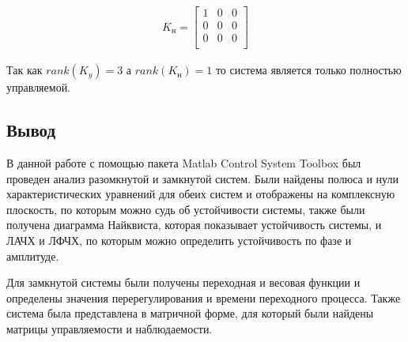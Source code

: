 \documentclass[a4paper,12pt]{article}
\begin{document}
	\begin{gather}
	\displaystyle K_\text{н}=\begin{bmatrix}
	1 & 0 & 0\\
	0 & 0 & 0\\
	0 & 0 & 0\\
	\end{bmatrix} 
		\end{gather}
	
	Так как $rank(K_y)=3$ а $rank(K_{\text{н}})=1$ то система является только полностью управляемой.
	
	\newpage
	\begin{center}
		\section*{Вывод}
	\end{center}
	\par
	В данной работе с помощью пакета Matlab Control System Toolbox был проведен анализ разомкнутой и замкнутой систем. Были найдены полюса и нули характеристических уравнений для обеих систем и отображены на комплексную плоскость, по которым можно судь об устойчивости системы, также были получена диаграмма Найквиста, которая показывает устойчивость системы, и ЛАЧХ и ЛФЧХ, по которым можно определить устойчивость по фазе и амплитуде.
	\par
	Для замкнутой системы были получены переходная и весовая функции и определены значения перерегулирования и времени переходного процесса. Также система была представлена в матричной форме, для который  были найдены матрицы управляемости и наблюдаемости.
	
\end{document}
